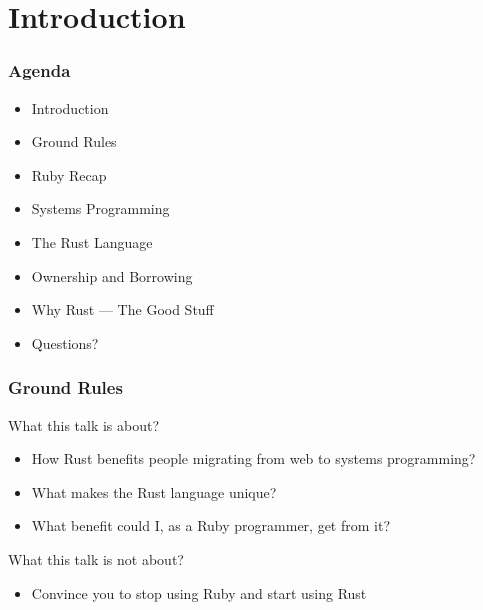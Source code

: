 \section{Introduction}
\label{sec:introduction}

\begin{frame}
  \frametitle{Agenda}
  \begin{itemize}
  \item Introduction
  \item Ground Rules
  \item Ruby Recap
  \item Systems Programming
  \item The Rust Language
  \item Ownership and Borrowing
  \item Why Rust --- The Good Stuff
  \item Questions?
  \end{itemize}
\end{frame}

\begin{frame}
  \frametitle{Ground Rules}
  What this talk is about?
  \begin{itemize}
  \item How Rust benefits people migrating from web to systems programming?
  \item What makes the Rust language unique?
  \item What benefit could I, as a Ruby programmer, get from it?
  \end{itemize}
  What this talk is not about?
  \begin{itemize}
  \item Convince you to stop using Ruby and start using Rust
  \end{itemize}
\end{frame}
